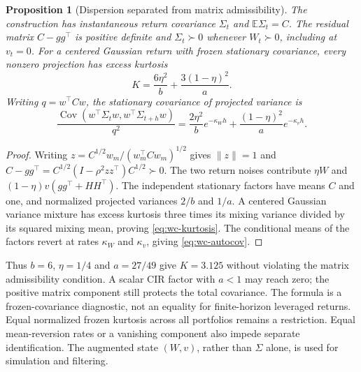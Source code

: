 \documentclass[11pt]{article}
\newtheorem{proposition}[theorem]{Proposition}
\theoremstyle{definition}\newtheorem{definition}[theorem]{Definition}
\theoremstyle{remark}\newtheorem{remark}[theorem]{Remark}
\newcommand{\E}{\mathbb E}\newcommand{\Prob}{\mathbb P}\newcommand{\R}{\mathbb R}
\begin{document}
\begin{proposition}[Dispersion separated from matrix admissibility]\label{prop:wc-dispersion}
The construction has instantaneous return covariance $\Sigma_t$ and $\E\Sigma_t=C$. The residual matrix $C-gg^\top$ is positive definite and $\Sigma_t\succ0$ whenever $W_t\succ0$, including at $v_t=0$. For a centered Gaussian return with frozen stationary covariance, every nonzero projection has excess kurtosis
\begin{equation}\label{eq:wc-kurtosis}
 K=\frac{6\eta^2}{b}+\frac{3(1-\eta)^2}{a}.
\end{equation}
Writing $q=w^\top Cw$, the stationary covariance of projected variance is
\begin{equation}\label{eq:wc-autocov}
 \frac{\operatorname{Cov}(w^\top\Sigma_t w,w^\top\Sigma_{t+h}w)}{q^2}
 =\frac{2\eta^2}{b}e^{-\kappa_W h}
  +\frac{(1-\eta)^2}{a}e^{-\kappa_v h}.
\end{equation}
\end{proposition}
\begin{proof}
Writing $z=C^{1/2}w_m/(w_m^\top Cw_m)^{1/2}$ gives $\|z\|=1$ and $C-gg^\top=C^{1/2}(I-\rho^2zz^\top)C^{1/2}\succ0$. The two return noises contribute $\eta W$ and $(1-\eta)v(gg^\top+HH^\top)$. The independent stationary factors have means $C$ and one, and normalized projected variances $2/b$ and $1/a$. A centered Gaussian variance mixture has excess kurtosis three times its mixing variance divided by its squared mixing mean, proving \eqref{eq:wc-kurtosis}. The conditional means of the factors revert at rates $\kappa_W$ and $\kappa_v$, giving \eqref{eq:wc-autocov}.
\end{proof}
Thus $b=6$, $\eta=1/4$ and $a=27/49$ give $K=3.125$ without violating the matrix admissibility condition. A scalar CIR factor with $a<1$ may reach zero; the positive matrix component still protects the total covariance. The formula is a frozen-covariance diagnostic, not an equality for finite-horizon leveraged returns. Equal normalized frozen kurtosis across all portfolios remains a restriction. Equal mean-reversion rates or a vanishing component also impede separate identification. The augmented state $(W,v)$, rather than $\Sigma$ alone, is used for simulation and filtering.
\end{document}
